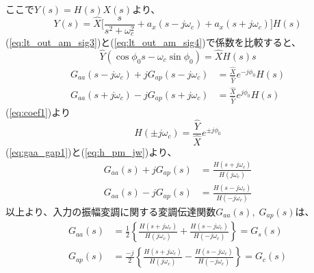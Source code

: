 \documentclass[book]{jlreq}
\begin{document}
%
ここで$Y(s) = H(s) X(s)$より、
%
\begin{equation}
    Y(s) = \hat{X}\biggl [\frac{s}{s^2+\omega_c^2} + a_x(s - j\omega_c) + a_x(s+j\omega_c)  \biggr ] H(s)
    \label{eq:lt_out_am_sig4}
\end{equation}
%
(\ref{eq:lt_out_am_sig3})と(\ref{eq:lt_out_am_sig4})で係数を比較すると、
%
\begin{equation}
    \hat{Y}(\cos\phi_0 s - \omega_c\sin\phi_0) = \hat{X}H(s) s 
    \label{eq:coef1}
\end{equation}
%
\begin{equation}
    \begin{split}
        G_{aa}(s-j\omega_c) + j G_{ap}(s-j\omega_c) &= \frac{\hat{X}}{\hat{Y}}e^{-j\phi_0}H(s) \\
        G_{aa}(s+j\omega_c) - j G_{ap}(s+j\omega_c) &= \frac{\hat{X}}{\hat{Y}}e^{j\phi_0}H(s)
    \end{split}
    \label{eq:gaa_gap1}
\end{equation}
%
(\ref{eq:coef1})より
%
\begin{equation}
    H(\pm j\omega_c) = \frac{\hat{Y}}{\hat{X}} e^{\pm j\phi_0}
    \label{eq:h_pm_jw}
\end{equation}
%
(\ref{eq:gaa_gap1})と(\ref{eq:h_pm_jw})より、
%
\begin{equation}
    \begin{split}
        G_{aa}(s) + j G_{ap}(s) &= \frac{H(s+j\omega_c)}{H(j\omega_c)} \\
        G_{aa}(s) - j G_{ap}(s) &= \frac{H(s-j\omega_c)}{H(-j\omega_c)}
    \end{split}
    \label{eq:gaa_gap2}
\end{equation}
%
以上より、入力の振幅変調に関する変調伝達関数$G_{aa}(s),\;G_{ap}(s)$は、
%
\begin{equation}
    \begin{split}
        G_{aa}(s) &= \frac{1}{2}\left\{\frac{H(s+j\omega_c)}{H(j\omega_c)} + \frac{H(s-j\omega_c)}{H(-j\omega_c)}\right\} = G_s(s)\\
        G_{ap}(s) &= \frac{-j}{2}\left\{\frac{H(s+j\omega_c)}{H(j\omega_c)} - \frac{H(s-j\omega_c)}{H(-j\omega_c)}\right\} = G_c(s)
    \end{split}
\end{equation}
\end{document}

